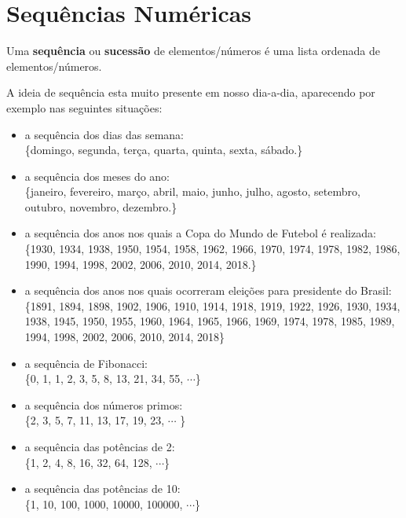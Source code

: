 \chapter{Sequências Numéricas}


\colorbox{azul}{
 \begin{minipage}{14.5cm}
 \begin{center}
  Uma \textbf{sequência} ou \textbf{sucessão} de elementos/números é uma lista ordenada de elementos/números.
 \end{center}
 \end{minipage}}
 \vskip0.3cm

 
A ideia de sequência esta muito presente em nosso dia-a-dia, aparecendo por exemplo nas seguintes situações:
\begin{exem}
 \begin{itemize}
  Exemplos de sequências:
  \item a sequência dos dias das semana:\\
  \{domingo, segunda, terça, quarta, quinta, sexta, sábado.\}
  \item a sequência dos meses do ano: \\
  \{janeiro, fevereiro, março, abril, maio, junho, julho, agosto, setembro, outubro, novembro, dezembro.\}
  \item a sequência dos anos nos quais a Copa do Mundo de Futebol é realizada: \\
  \{1930, 1934, 1938, 1950, 1954, 1958, 1962, 1966, 1970, 1974, 1978, 1982, 1986, 1990, 1994, 1998, 2002, 2006, 2010, 2014, 2018.\}
  \item a sequência dos anos nos quais ocorreram eleições para presidente do Brasil: \\
  \{1891, 1894, 1898, 1902, 1906, 1910, 1914, 1918, 1919, 1922, 1926, 1930, 1934, 1938, 1945, 1950, 1955, 1960, 1964, 1965, 1966, 1969, 1974, 1978, 1985, 1989, 1994, 1998, 2002, 2006, 2010, 2014, 2018\}
  \item a sequência de Fibonacci: \\
  \{0, 1, 1, 2, 3, 5, 8, 13, 21, 34, 55, $\cdots$\}
  \item a sequência dos números primos: \\
  \{2, 3, 5, 7, 11, 13, 17, 19, 23, $\cdots$ \}
  \item a sequência das potências de 2: \\
  \{1, 2, 4, 8, 16, 32, 64, 128, $\cdots$\}
  \item a sequência das potências de 10: \\
  \{1, 10, 100, 1000, 10000, 100000, $\cdots$\}
  \end{itemize}

\end{exem}

